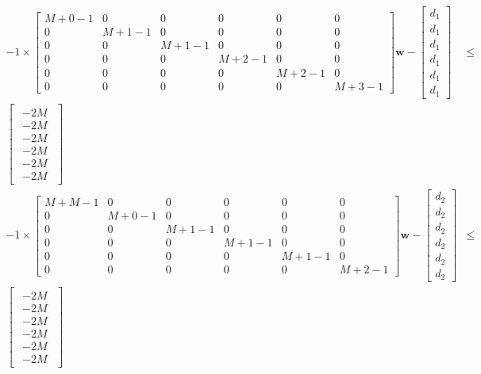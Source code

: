 \documentclass[authoryear,preprint,review,12pt]{elsarticle}
\begin{document}
\begin{eqnarray*}
-1\times\left[\begin{array}{cccccc}
M+0-1 & 0 & 0 & 0 & 0 & 0\\
0 & M+1-1 & 0 & 0 & 0 & 0\\
0 & 0 & M+1-1 & 0 & 0 & 0\\
0 & 0 & 0 & M+2-1 & 0 & 0\\
0 & 0 & 0 & 0 & M+2-1 & 0\\
0 & 0 & 0 & 0 & 0 & M+3-1
\end{array}\right]\mathbf{w}-\left[\begin{array}{c}
d_{1}\\
d_{1}\\
d_{1}\\
d_{1}\\
d_{1}\\
d_{1}
\end{array}\right] & \leq & \\ \left[\begin{array}{c}
\begin{array}{c}
-2M\\
-2M\\
-2M\\
-2M\\
-2M\\
-2M
\end{array}\end{array}\right]
&&\\
-1\times\left[\begin{array}{cccccc}
M+M-1 & 0 & 0 & 0 & 0 & 0\\
0 & M+0-1 & 0 & 0 & 0 & 0\\
0 & 0 & M+1-1 & 0 & 0 & 0\\
0 & 0 & 0 & M+1-1 & 0 & 0\\
0 & 0 & 0 & 0 & M+1-1 & 0\\
0 & 0 & 0 & 0 & 0 & M+2-1
\end{array}\right]\mathbf{w}-\left[\begin{array}{c}
d_{2}\\
d_{2}\\
d_{2}\\
d_{2}\\
d_{2}\\
d_{2}
\end{array}\right] &\leq &\\  \left[\begin{array}{c}
\begin{array}{c}
-2M\\
-2M\\
-2M\\
-2M\\
-2M\\
-2M
\end{array}\end{array}\right]&&
\end{eqnarray*}
\end{document}
